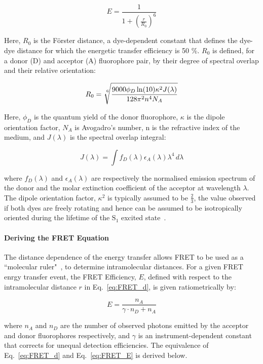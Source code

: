 \begin{equation}
E = \frac{1}{1+ (\frac{r}{R_0})^6}
\label{eq:FRET_d}
\end{equation}

Here, $R_0$ is the F\"{o}rster distance, a dye-dependent constant that defines the dye-dye distance for which the energetic transfer efficiency is 50 \%. $R_0$ is defined, for a donor (D) and acceptor (A) fluorophore pair, by their degree of spectral overlap and their relative orientation:

\begin{equation}
R_0 = \sqrt[\leftroot{-2}\uproot{2}6]{\frac{9000\phi_D\ln(10)\kappa^2J(\lambda)}{128\pi^2n^4N_A}}
\label{eq:R_0}
\end{equation}

Here, $\phi_D$ is the quantum yield of the donor fluorophore, $\kappa$ is the dipole orientation factor, $N_A$ is Avogadro's number, n is the refractive index of the medium, and $J(\lambda)$ is the spectral overlap integral:

\begin{equation}
J(\lambda) = \int f_D(\lambda)\epsilon_A(\lambda)\lambda^4\,d\lambda
\label{eq:J}
\end{equation}

where $f_D(\lambda)$ and $\epsilon_A(\lambda)$ are respectively the normalised emission spectrum of the donor and the molar extinction coefficient of the acceptor at wavelength $\lambda$. The dipole orientation factor, $\kappa^2$ is typically assumed to be $\frac{2}{3}$, the value observed if both dyes are freely rotating and hence can be assumed to be isotropically oriented during the lifetime of the $\text{S}_1$ excited state~\cite{Demchenko2008}.

\paragraph{Deriving the FRET Equation}
The distance dependence of the energy transfer allows FRET to be used as a ``molecular ruler"~\cite{stryer67}, to determine intramolecular distances. For a given FRET enrgy transfer event, the FRET Efficiency, $E$, defined with respect to the intramolecular distance $r$ in Eq.~\ref{eq:FRET_d}, is given ratiometrically by:

\begin{equation}
E = \frac{n_A}{\gamma \cdot n_D + n_A}
\label{eq:FRET_E}
\end{equation}

where $n_A$ and $n_D$ are the number of observed photons emitted by the acceptor and donor fluorophores respectively, and $\gamma$ is an instrument-dependent constant that corrects for unequal detection efficiencies. The equivalence of Eq.~\ref{eq:FRET_d} and Eq.~\ref{eq:FRET_E} is derived below.

